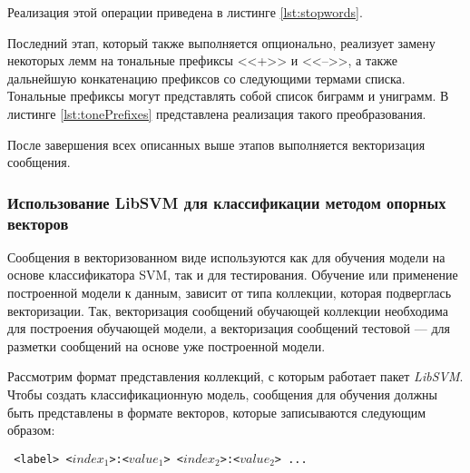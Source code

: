     Реализация этой операции приведена в листинге \ref{lst:stopwords}.
    \lstset{style=python}
    

    Последний этап, который также выполняется опционально, реализует замену
    некоторых лемм на тональные префиксы <<+>> и <<-->>, а также дальнейшую
    конкатенацию префиксов со следующими термами списка. Тональные префиксы
    могут представлять собой список биграмм и униграмм. В листинге
    \ref{lst:tonePrefixes} представлена реализация такого преобразования.

    \lstset{style=python}
    


    После завершения всех описанных выше этапов выполняется векторизация
    сообщения.

    \subsubsection{Использование LibSVM для классификации методом опорных векторов}

    Сообщения в векторизованном виде используются как для обучения
    модели на основе классификатора SVM, так и для тестирования.
    Обучение или применение построенной модели к данным, зависит от типа коллекции,
    которая подверглась векторизации.
    Так, векторизация сообщений обучающей коллекции необходима для построения
    обучающей модели, а векторизация сообщений тестовой --- для разметки сообщений
    на основе уже построенной модели.

    Рассмотрим формат представления коллекций, с которым работает пакет {\it LibSVM}.
    Чтобы создать классификационную модель, сообщения для обучения должны быть
    представлены в формате векторов, которые записываются следующим образом:
    \begin{center}
        \tt
        <label> <$index_1$>:<$value_1$> <$index_2$>:<$value_2$> ...
    \end{center}

